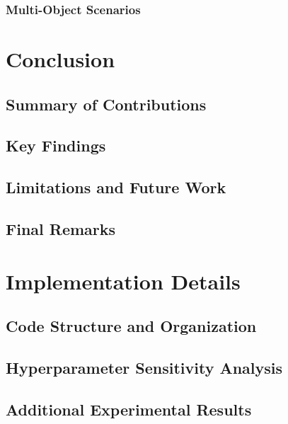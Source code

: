 \documentclass[
	english,
	ruledheaders=section,
	class=report,
	thesis={type=master},
	accentcolor=9c,
	custommargins=true,
	marginpar=false,
	parskip=half-,
	fontsize=11pt,
]{tudapub}
\begin{document}
\subsection{Multi-Object Scenarios}
\label{subsec:multi_object}

\chapter{Conclusion}
\label{chap:conclusion}

\section{Summary of Contributions}
\label{sec:summary_contributions}

\section{Key Findings}
\label{sec:key_findings}

\section{Limitations and Future Work}
\label{sec:limitations_future}

\section{Final Remarks}
\label{sec:final_remarks}

\printbibliography

\appendix

\chapter{Implementation Details}
\label{app:implementation}

\section{Code Structure and Organization}
\label{app:code_structure}

\section{Hyperparameter Sensitivity Analysis}
\label{app:hyperparameter_analysis}

\section{Additional Experimental Results}
\label{app:additional_results}
\end{document}
